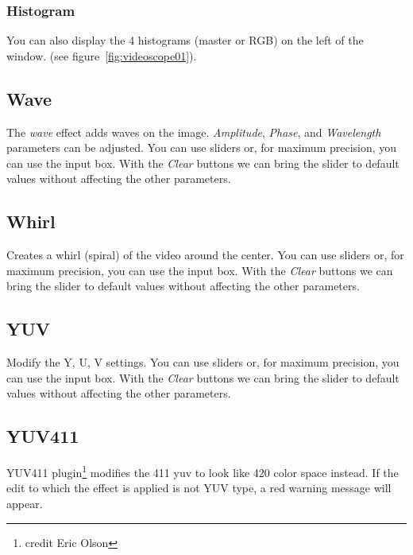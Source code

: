\subsubsection*{Histogram}%
\label{ssub:histogram}

You can also display the 4 histograms (master or RGB) on the left of the window. (see figure~\ref{fig:videoscope01}).

\subsection{Wave}%
\label{sub:wave}

The \textit{wave} effect adds waves on the image. \textit{Amplitude}, \textit{Phase}, and \textit{Wavelength} parameters can be adjusted. You can use sliders or, for maximum precision, you can use the input box. With the \textit{Clear} buttons we can bring the slider to default values without affecting the other parameters.

\subsection{Whirl}%
\label{sub:whirl}

Creates a whirl (spiral) of the video around the center. You can use sliders or, for maximum precision, you can use the input box. With the \textit{Clear} buttons we can bring the slider to default values without affecting the other parameters.

\subsection{YUV}%
\label{sub:yuv}

Modify the Y, U, V settings. You can use sliders or, for maximum precision, you can use the input box. With the \textit{Clear} buttons we can bring the slider to default values without affecting the other parameters.

\subsection{YUV411}%
\label{sub:yuv411}

YUV411 plugin\protect\footnote{credit Eric Olson}
modifies the 411 yuv to look like 420 color space instead. If the edit to which the effect is applied is not YUV type, a red warning message will appear.

